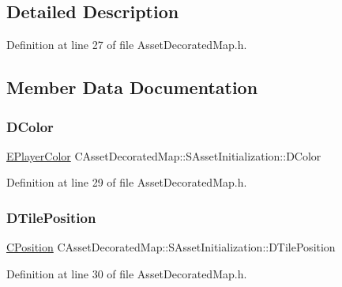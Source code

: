 \subsection{Detailed Description}


Definition at line 27 of file Asset\+Decorated\+Map.\+h.



\subsection{Member Data Documentation}
\hypertarget{structCAssetDecoratedMap_1_1SAssetInitialization_a56ad740f8d319066e5ef5781fe6c636f}{}\label{structCAssetDecoratedMap_1_1SAssetInitialization_a56ad740f8d319066e5ef5781fe6c636f} 
\subsubsection{\texorpdfstring{D\+Color}{DColor}}
{\footnotesize\ttfamily \hyperlink{GameDataTypes_8h_aafb0ca75933357ff28a6d7efbdd7602f}{E\+Player\+Color} C\+Asset\+Decorated\+Map\+::\+S\+Asset\+Initialization\+::\+D\+Color}



Definition at line 29 of file Asset\+Decorated\+Map.\+h.

\hypertarget{structCAssetDecoratedMap_1_1SAssetInitialization_a2579060dadc045d36f4e316096827471}{}\label{structCAssetDecoratedMap_1_1SAssetInitialization_a2579060dadc045d36f4e316096827471} 
\subsubsection{\texorpdfstring{D\+Tile\+Position}{DTilePosition}}
{\footnotesize\ttfamily \hyperlink{classCPosition}{C\+Position} C\+Asset\+Decorated\+Map\+::\+S\+Asset\+Initialization\+::\+D\+Tile\+Position}



Definition at line 30 of file Asset\+Decorated\+Map.\+h.

